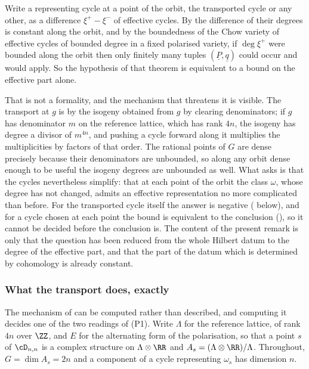 \begin{remark}
\label{rem:whereunbounded}
Write a representing cycle at a point of the orbit, the transported cycle
or any other, as a difference $\xi^{+}-\xi^{-}$ of effective cycles. By  the difference of their degrees is
constant along the orbit, and by the boundedness of the Chow variety of
effective cycles of bounded degree in a fixed polarised variety, if
$\deg\xi^{+}$ were bounded along the orbit then only finitely many tuples
$(\underline{P},\underline{q})$ could occur and  would
apply. So the hypothesis of that theorem is equivalent to a bound on the
effective part alone.

That is not a formality, and the mechanism that threatens it is visible. The
transport at $g$ is by the isogeny obtained from $g$ by clearing denominators;
if $g$ has denominator $m$ on the reference lattice, which has rank $4n$, the
isogeny has degree a divisor of $m^{4n}$, and pushing a cycle forward along it
multiplies the multiplicities by factors of that order. The rational points of
$G$ are dense precisely because their denominators are unbounded, so along any
orbit dense enough to be useful the isogeny degrees are unbounded as well.
What  asks is that the cycles nevertheless simplify: that
at each point of the orbit the class $\omega$, whose degree has not changed,
admits an effective representation no more complicated than before. For the
transported cycle itself the answer is negative ( below),
and for a cycle chosen at each point the bound is equivalent to the conclusion
(), so it cannot be decided before the conclusion is.
The content of the present remark is only that the question has been reduced from the whole
Hilbert datum to the degree of the effective part, and that the part of the
datum which is determined by cohomology is already constant.
\end{remark}

\subsubsection*{What the transport does, exactly}

The mechanism of  can be computed rather than
described, and computing it decides one of the two readings of (P1). Write
$\Lambda$ for the reference lattice, of rank $4n$ over $\ZZ$, and $E$ for the
alternating form of the polarisation, so that a point $s$ of $\cD_{n,n}$ is a
complex structure on $\Lambda\otimes\RR$ and $A_{s}=(\Lambda\otimes\RR)/\Lambda$.
Throughout, $G=\dim A_{s}=2n$ and a component of a cycle representing
$\omega_{s}$ has dimension $n$.

